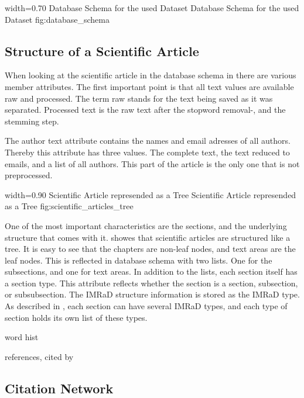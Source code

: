       {width=0.70\textwidth}
      {Database Schema for the used Dataset}
      {Database Schema for the used Dataset}
      {fig:database_schema}

\subsection{Structure of a Scientific Article}
\label{sec:structure_scientific_article}

When looking at the scientific article in the database schema in  there are various member attributes. The first important point is that all text values are available raw and processed. The term raw stands for the text being saved as it was separated. Processed text is the raw text after the stopword removal-, and the stemming step.

The author text attribute contains the names and email adresses of all authors. Thereby this attribute has three values. The complete text, the text reduced to emails, and a list of all authors. This part of the article is the only one that is not preprocessed.

      {width=0.90\textwidth}
      {Scientific Article represended as a Tree}
      {Scientific Article represended as a Tree}
      {fig:scientific_articles_tree}

One of the most important characteristics are the sections, and the underlying structure that comes with it.  showes that scientific articles are structured like a tree. It is easy to see that the chapters are non-leaf nodes, and text areas are the leaf nodes. This is reflected in database schema with two lists. One for the subsections, and one for text areas. In addition to the lists, each section itself has a section type. This attribute reflects whether the section is a section, subsection, or subsubsection. The IMRaD structure information is stored as the IMRaD type. As described in , each section can have several IMRaD types, and each type of section holds its own list of these types.

word hist

references, cited by

\subsection{Citation Network}
\label{sec:citation_network}

